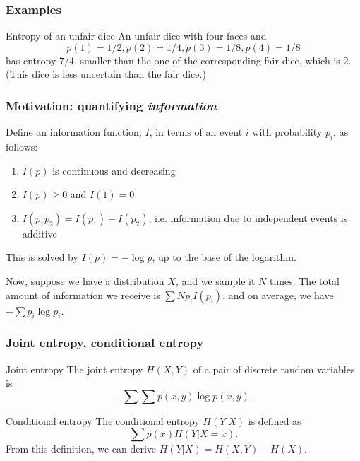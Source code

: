 \documentclass{beamer}
\begin{document}
\begin{frame}
  \frametitle{Examples}
  \begin{exampleblock}{Entropy of an unfair dice}
    An unfair dice with four faces and \[ p(1) = 1/2, p(2) = 1/4, p(3) = 1/8, p(4) = 1/8 \] has entropy $7/4$, smaller than the one of the corresponding fair dice, which is $2$. (This dice is less uncertain than the fair dice.)
  \end{exampleblock}
\end{frame}

\begin{frame}
  \frametitle{Motivation: quantifying \emph{information}}
  Define an information function, $I$, in terms of an event $i$ with probability $p_i$, as follows: \pause
  \begin{enumerate}
    \item $I(p)$ is continuous and decreasing \pause
    \item $I(p) \ge 0$ and $I(1) = 0$ \pause
    \item $I(p_1p_2) = I(p_1) + I(p_2)$, i.e. information due to independent events is additive \pause
  \end{enumerate}
  This is solved by $I(p) = - \log p$, up to the base of the logarithm. \pause

  Now, suppose we have a distribution $X$, and we sample it $N$ times. The total amount of information we receive is $\sum N p_i I(p_i)$, and on average, we have $- \sum p_i \log p_i$.
\end{frame}

\begin{frame}
  \frametitle{Joint entropy, conditional entropy}
  \begin{block}{Joint entropy}
    The joint entropy $H(X, Y)$ of a pair of discrete random variables is \[ - \sum \sum p(x, y) \log p(x, y). \]
  \end{block} \pause

  \begin{block}{Conditional entropy}
    The conditional entropy $H(Y|X)$ is defined as \[ \sum p(x) H(Y | X = x). \] \pause
    From this definition, we can derive $H(Y|X) = H(X, Y) - H(X)$.
  \end{block}
\end{frame}
\end{document}
